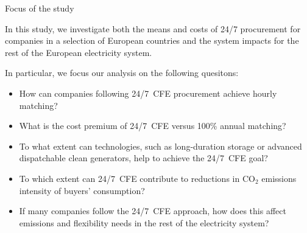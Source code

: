 \begin{frame}{Focus of the study}

  In this study, we investigate both the \alert{means and costs of 24/7 procurement} 
  for companies in a selection of European countries 
  and the \alert{system impacts} for the rest of the European electricity system. 
  
  \vspace{0.3cm}
  In particular, we focus our analysis on the following quesitons:
    \begin{itemize}
    \item How can companies following 24/7~CFE procurement achieve hourly matching?
    \item What is the cost premium of 24/7~CFE versus 100\% annual matching?
    \item To what extent can technologies, such as long-duration storage or advanced dispatchable
          clean generators, help to achieve the 24/7~CFE goal?
    \item To which extent can 24/7~CFE contribute to reductions in CO$_2$
          emissions intensity of buyers' consumption? 
    \item If many companies follow the 24/7~CFE approach, how does this affect 
    emissions and flexibility needs in the rest of the electricity system?
    \end{itemize}

\end{frame}



